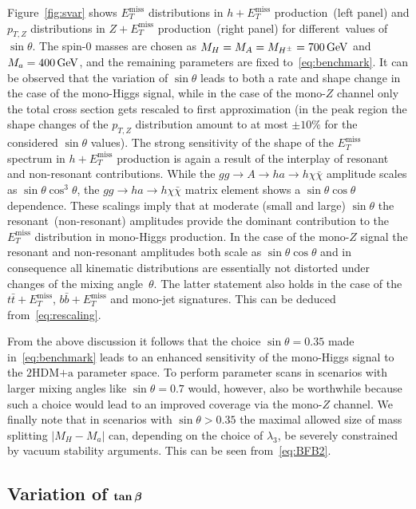 \documentclass[a4paper, 11pt,notoc]{article}
\newcommand{\MET}{\ensuremath{E_T^\mathrm{miss}}\xspace}
\newcommand{\mA}{\ensuremath{M_{A}}\xspace}
\newcommand{\ma}{\ensuremath{M_{a}}\xspace}
\newcommand{\mH}{\ensuremath{M_{H}}\xspace}
\newcommand{\mHc}{\ensuremath{M_{H^{\pm}}}\xspace}
\newcommand{\hdma}{\ensuremath{\textrm{2HDM+a}}\xspace}
\def\bm#1{\mbox{\boldmath$#1$\unboldmath}}
\begin{document}
Figure~\ref{fig:svar} shows $\MET$ distributions in $h + \MET$ production~(left panel) and $p_{T,Z}$ distributions in $Z+\MET$ production~(right panel) for different~values of $\sin \theta$. The spin-0 masses are chosen as $\mH = \mA = \mHc = 700 \, {\rm GeV}$ and $\ma = 400 \, {\rm GeV}$, and the remaining parameters are fixed to~\eqref{eq:benchmark}. It can be observed that the variation of $\sin \theta$ leads to both a rate and shape change in the case of the mono-Higgs signal, while in the case of the mono-$Z$ channel only the total cross section gets rescaled to first approximation (in the peak region the shape changes of the $p_{T,Z}$ distribution amount to at most $\pm 10\%$ for the considered $\sin \theta$ values). The strong sensitivity of the shape of the $\MET$ spectrum in $h + \MET$ production is again a result of the interplay of resonant and non-resonant contributions. While the $gg \to A \to h a \to h \chi \bar \chi$  amplitude scales as $\sin \theta \cos^3 \theta$, the $gg \to h a  \to h \chi \bar \chi$ matrix element shows a $\sin \theta \cos \theta$ dependence. These scalings imply that at moderate  (small and large) $\sin \theta$ the resonant~(non-resonant) amplitudes provide the dominant contribution to the $\MET$ distribution in mono-Higgs production.  In the case of the mono-$Z$ signal the resonant and non-resonant amplitudes both scale as $\sin \theta \cos \theta$ and in consequence  all kinematic distributions are essentially not distorted  under changes of the mixing angle~$\theta$. The latter statement also holds in the case of the $t \bar t +\MET$, $b \bar b + \MET$ and mono-jet signatures.  This can be deduced from~\eqref{eq:rescaling}. 

From the above discussion it follows that the choice $\sin \theta = 0.35$ made in~\eqref{eq:benchmark} leads to an enhanced sensitivity of the mono-Higgs signal to the \hdma parameter space. To perform parameter scans in scenarios with larger mixing angles like $\sin \theta = 0.7$ would, however, also be worthwhile because such a choice would lead to an improved coverage via the mono-$Z$ channel. We finally note that in scenarios with $\sin \theta >0.35$ the maximal allowed size of mass splitting $|M_H - M_a|$ can, depending on the choice of $\lambda_3$, be severely constrained by vacuum stability arguments. This can be seen from~\eqref{eq:BFB2}. 

\subsection{Variation of $\bm{\tan \beta}$}
\end{document}
